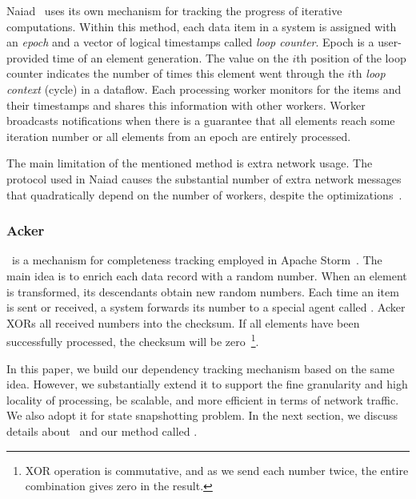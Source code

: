 Naiad~\cite{Murray:2013:NTD:2517349.2522738} uses its own mechanism for tracking the progress of iterative computations. Within this method, each data item in a system is assigned with an {\em epoch} and a vector of logical timestamps called {\em loop counter}. Epoch is a user-provided time of an element generation. The value on the $i$th position of the loop counter indicates the number of times this element went through the $i$th {\em loop context} (cycle) in a dataflow. Each processing worker monitors for the items and their timestamps and shares this information with other workers. Worker broadcasts notifications when there is a guarantee that all elements reach some iteration number or all elements from an epoch are entirely processed.

The main limitation of the mentioned method is extra network usage. The protocol used in Naiad causes the substantial number of extra network messages that quadratically depend on the number of workers, despite the optimizations~\cite{Murray:2013:NTD:2517349.2522738}. 


\subsubsection{Acker}

\acker\ is a mechanism for completeness tracking employed in Apache Storm~\cite{apache:storm}. The main idea is to enrich each data record with a random number. When an element is transformed, its descendants obtain new random numbers. Each time an item is sent or received, a system forwards its number to a special agent called {\em \acker}. Acker XORs all received numbers into the checksum. If all elements have been successfully processed, the checksum will be zero~\footnote{XOR operation is commutative, and as we send each number twice, the entire combination gives zero in the result.}.

In this paper, we build our dependency tracking mechanism based on the same idea. However, we substantially extend it to support the fine granularity and high locality of processing, be scalable, and more efficient in terms of network traffic. We also adopt it for state snapshotting problem. In the next section, we discuss details about \acker\ and our method called \tracker .